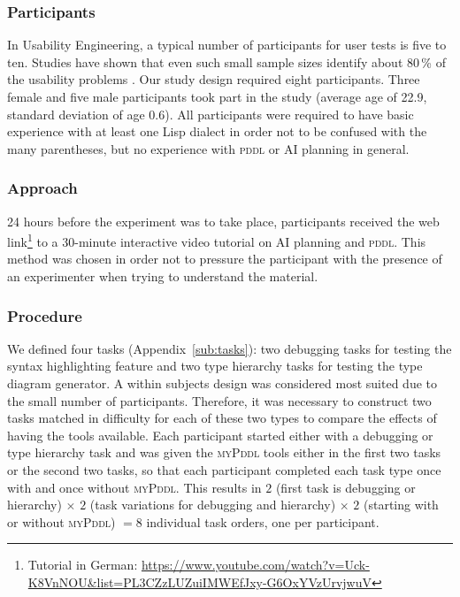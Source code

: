 \documentclass[runningheads]{llncs}
\newcommand{\mypddl}{\textsc{myPddl}\xspace}
\newcommand{\pddl}{\textsc{pddl}\xspace}
\begin{document}
\subsubsection{Participants}

In Usability Engineering, a typical number of participants for user
tests is five to ten. Studies have shown that even such small sample
sizes identify about 80\,\% of the usability problems
\cite{nielsen1994estimating,hwang2010number}. Our study design
required eight participants. Three female and five male participants
took part in the study (average age of 22.9, standard deviation of age
0.6). All participants were required to have basic experience with at
least one Lisp dialect in order not to be confused with the many
parentheses, but no experience with \pddl or AI planning in general.

\subsubsection{Approach}

24 hours before the experiment was to take place, participants
received the web link\footnote{Tutorial in German:
  \url{https://www.youtube.com/watch?v=Uck-K8VnNOU&list=PL3CZzLUZuiIMWEfJxy-G6OxYVzUrvjwuV}}
to a 30-minute interactive video tutorial on AI planning and
\pddl. This method was chosen in order not to pressure the participant
with the presence of an experimenter when trying to understand the
material.

\subsubsection{Procedure}

We defined four tasks (Appendix~\ref{sub:tasks}): two debugging tasks
for testing the syntax highlighting feature and two type hierarchy
tasks for testing the type diagram generator. A within subjects design
was considered most suited due to the small number of
participants. Therefore, it was necessary to construct two tasks
matched in difficulty for each of these two types to compare the
effects of having the tools available. Each participant started either
with a debugging or type hierarchy task and was given the \mypddl
tools either in the first two tasks or the second two tasks, so that
each participant completed each task type once with and once without
\mypddl. This results in $2$ (first task is debugging or hierarchy)
$\times$ $2$ (task variations for debugging and hierarchy) $\times$
$2$ (starting with or without \mypddl) $= 8$ individual task orders,
one per participant.
\end{document}
